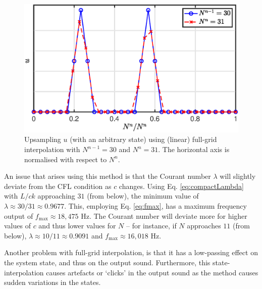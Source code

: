 \documentclass[dvipsnames, preprint]{JASA}
\begin{document}
\begin{figure}
\includegraphics[width=\reprintcolumnwidth]{fullGrid}
\caption{\label{fig:fullGrid}{Upsampling $u$ (with an arbitrary state) using (linear) full-grid interpolation with $N^{n-1} = 30$ and $N^n = 31$. The horizontal axis is normalised with respect to $N^n$.}}
\end{figure} 

An issue that arises using this method is that the Courant number $\lambda$ will slightly deviate from the CFL condition as $c$ changes. Using Eq. \eqref{eq:compactLambda} with $L/ck$ approaching $31$ (from below), the minimum value of $\lambda \approx 30/31 \approx 0.9677$.
This, employing Eq. \eqref{eq:fmax}, has a maximum frequency output of $f_\text{max} \approx 18,475$ Hz. 
The Courant number will deviate more for higher values of $c$ and thus lower values for $N$ -- for instance, if $N$ approaches $11$ (from below), $\lambda \approx 10/11 \approx 0.9091$ and $f_\text{max} \approx 16,018$ Hz.

Another problem with full-grid interpolation, is that it has a low-passing effect on the system state, and thus on the output sound. %
Furthermore, this state-interpolation causes artefacts or `clicks' in the output sound as the method causes sudden variations in the states.  
\end{document}
